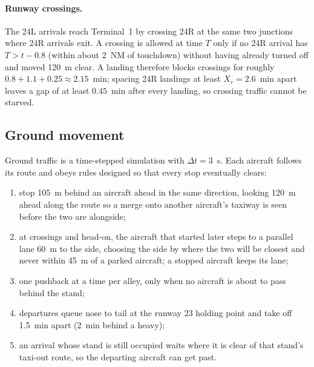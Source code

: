 \documentclass[11pt]{article}
\theoremstyle{remark}
\begin{document}
\paragraph{Runway crossings.} The 24L arrivals reach Terminal~1 by crossing 24R at the same two
junctions where 24R arrivals exit. A crossing is allowed at time $T$ only if no 24R arrival has
$T>t-0.8$ (within about 2~NM of touchdown) without having already turned off and moved 120~m clear.
A landing therefore blocks crossings for roughly $0.8+1.1+0.25\approx2.15$~min; spacing 24R landings
at least $X_r=2.6$~min apart leaves a gap of at least $0.45$~min after every landing, so crossing
traffic cannot be starved.

\subsection{Ground movement}
Ground traffic is a time-stepped simulation with $\Delta t=3$~s. Each aircraft follows its route and
obeys rules designed so that every stop eventually clears:
\begin{enumerate}[leftmargin=*,itemsep=1pt]
\item stop 105~m behind an aircraft ahead in the same direction, looking 120~m ahead along the route
      so a merge onto another aircraft's taxiway is seen before the two are alongside;
\item at crossings and head-on, the aircraft that started later steps to a parallel lane 60~m to the
      side, choosing the side by where the two will be closest and never within 45~m of a parked
      aircraft; a stopped aircraft keeps its lane;
\item one pushback at a time per alley, only when no aircraft is about to pass behind the stand;
\item departures queue nose to tail at the runway 23 holding point and take off 1.5~min apart (2~min
      behind a heavy);
\item an arrival whose stand is still occupied waits where it is clear of that stand's taxi-out
      route, so the departing aircraft can get past.
\end{enumerate}
\end{document}
